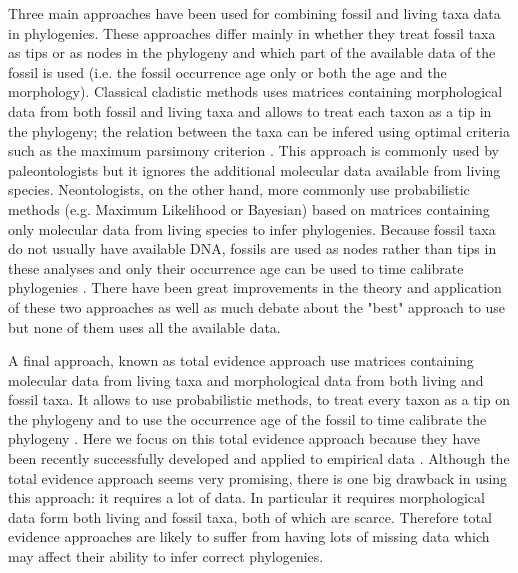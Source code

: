 \documentclass[12pt,letterpaper]{article}
\begin{document}
Three main approaches have been used for combining fossil and living taxa data in phylogenies.
These approaches differ mainly in whether they treat fossil taxa as tips or as nodes in the phylogeny and which part of the available data of the fossil is used (i.e. the fossil occurrence age only or both the age and the morphology).
Classical cladistic methods uses matrices containing morphological data from both fossil and living taxa and allows to treat each taxon as a tip in the phylogeny; the relation between the taxa can be infered using optimal criteria such as the maximum parsimony criterion \citep{simpson1945}.
This approach is commonly used by paleontologists but it ignores the additional molecular data available from living species.
Neontologists, on the other hand, more commonly use probabilistic methods (e.g. Maximum Likelihood or Bayesian) based on matrices containing only molecular data from living species to infer phylogenies.
Because fossil taxa do not usually have available DNA, fossils are used as nodes rather than tips in these analyses and only their occurrence age can be used to time calibrate phylogenies \citep{zuckerkandl1965}.
There have been great improvements in the theory and application of these two approaches \citep[e.g.][]{bapsta2013,stadlerdating2013,heaththe2013} as well as much debate about the "best" approach to use \citep[e.g.][]{spencerefficacy2013} but none of them uses all the available data.

A final approach, known as total evidence approach use matrices containing molecular data from living taxa and morphological data from both living and fossil taxa. %
It allows to use probabilistic methods, to treat every taxon as a tip on the phylogeny and to use the occurrence age of the fossil to time calibrate the phylogeny \citep{eernissetaxonomic1993}.
Here we focus on this total evidence approach because they have been recently successfully developed and applied to empirical data \citep{pyrondivergence2011,ronquista2012,schragocombining2013}.  %
Although the total evidence approach seems very promising, there is one big drawback in using this approach: it requires a lot of data.
In particular it requires morphological data form both living and fossil taxa, both of which are scarce.
Therefore total evidence approaches are likely to suffer from having lots of missing data which may affect their ability to infer correct phylogenies. %
\end{document}

